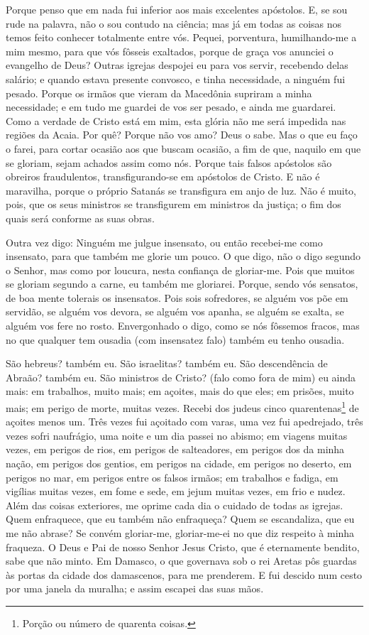 Porque penso que em nada fui inferior aos mais excelentes
apóstolos. E, se sou rude na palavra, não o sou contudo na
ciência; mas já em todas as coisas nos temos feito conhecer
totalmente entre vós. Pequei, porventura, humilhando-me a mim
mesmo, para que vós fôsseis exaltados, porque de graça vos anunciei
o evangelho de Deus? Outras igrejas despojei eu para vos servir,
recebendo delas salário; e quando estava presente convosco, e tinha
necessidade, a ninguém fui pesado. Porque os irmãos que vieram
da Macedônia supriram a minha necessidade; e em tudo me guardei de
vos ser pesado, e ainda me guardarei. Como a verdade de
Cristo está em mim, esta glória não me será impedida nas regiões da
Acaia. Por quê? Porque não vos amo? Deus o sabe. Mas o
que eu faço o farei, para cortar ocasião aos que buscam ocasião, a
fim de que, naquilo em que se gloriam, sejam achados assim como nós.
Porque tais falsos apóstolos são obreiros fraudulentos,
transfigurando-se em apóstolos de Cristo. E não é maravilha,
porque o próprio Satanás se transfigura em anjo de luz. Não é
muito, pois, que os seus ministros se transfigurem em ministros da
justiça; o fim dos quais será conforme as suas obras.

Outra vez digo: Ninguém me julgue insensato, ou então recebei-me
como insensato, para que também me glorie um pouco. O que
digo, não o digo segundo o Senhor, mas como por loucura, nesta
confiança de gloriar-me. Pois que muitos se gloriam segundo a
carne, eu também me gloriarei. Porque, sendo vós sensatos, de
boa mente tolerais os insensatos. Pois sois sofredores, se
alguém vos põe em servidão, se alguém vos devora, se alguém vos
apanha, se alguém se exalta, se alguém vos fere no rosto.
Envergonhado o digo, como se nós fôssemos fracos, mas no que
qualquer tem ousadia (com insensatez falo) também eu tenho ousadia.

São hebreus? também eu. São israelitas? também eu. São
descendência de Abraão? também eu. São ministros de Cristo?
(falo como fora de mim) eu ainda mais: em trabalhos, muito mais; em
açoites, mais do que eles; em prisões, muito mais; em perigo de
morte, muitas vezes. Recebi dos judeus cinco
quarentenas\footnote{Porção ou número de quarenta coisas.} de
açoites menos um. Três vezes fui açoitado com varas, uma vez
fui apedrejado, três vezes sofri naufrágio, uma noite e um dia
passei no abismo; em viagens muitas vezes, em perigos de
rios, em perigos de salteadores, em perigos dos da minha nação, em
perigos dos gentios, em perigos na cidade, em perigos no deserto, em
perigos no mar, em perigos entre os falsos irmãos; em
trabalhos e fadiga, em vigílias muitas vezes, em fome e sede, em
jejum muitas vezes, em frio e nudez. Além das coisas
exteriores, me oprime cada dia o cuidado de todas as igrejas.
Quem enfraquece, que eu também não enfraqueça? Quem se
escandaliza, que eu me não abrase? Se convém gloriar-me,
gloriar-me-ei no que diz respeito à minha fraqueza. O Deus e
Pai de nosso Senhor Jesus Cristo, que é eternamente bendito, sabe
que não minto. Em Damasco, o que governava sob o rei Aretas
pôs guardas às portas da cidade dos damascenos, para me prenderem.
E fui descido num cesto por uma janela da muralha; e assim
escapei das suas mãos.

